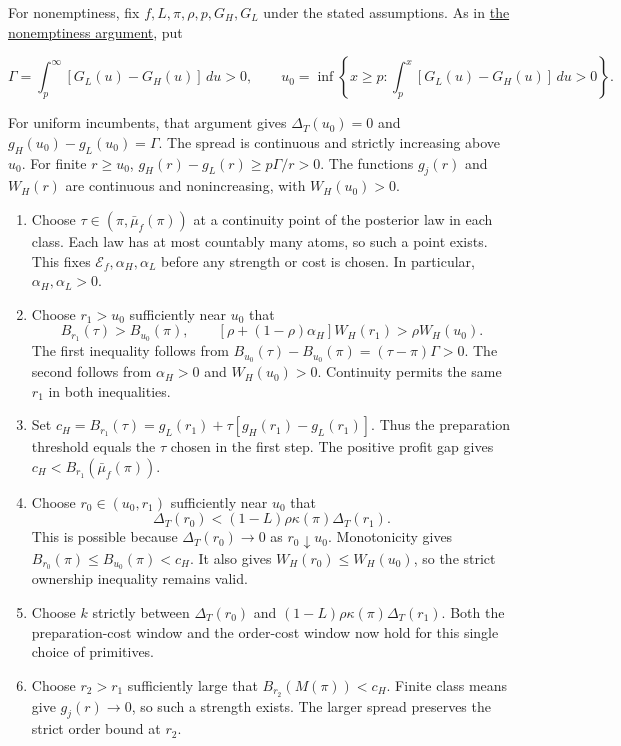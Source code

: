 For nonemptiness, fix \(f,L,\pi,\rho,p,G_H,G_L\) under the stated assumptions.
As in \hyperref[nonemptiness-for-every-value-gap]{the nonemptiness argument}, put

\[
\Gamma=\int_p^\infty[G_L(u)-G_H(u)]\,du>0,\qquad
u_0=\inf\left\{x\ge p:\int_p^x[G_L(u)-G_H(u)]\,du>0\right\}.
\]

For uniform incumbents, that argument gives \(\Delta_T(u_0)=0\) and \(g_H(u_0)-g_L(u_0)=\Gamma\).
The spread is continuous and strictly increasing above \(u_0\).
For finite \(r\ge u_0\), \(g_H(r)-g_L(r)\ge p\Gamma/r>0\).
The functions \(g_j(r)\) and \(W_H(r)\) are continuous and nonincreasing, with \(W_H(u_0)>0\).

\begin{enumerate}
\item
Choose \(\tau\in(\pi,\bar\mu_f(\pi))\) at a continuity point of the posterior law in each class.
Each law has at most countably many atoms, so such a point exists.
This fixes \(\mathcal E_f,\alpha_H,\alpha_L\) before any strength or cost is chosen.
In particular, \(\alpha_H,\alpha_L>0\).

\item
Choose \(r_1>u_0\) sufficiently near \(u_0\) that
\[
B_{r_1}(\tau)>B_{u_0}(\pi),\qquad
[\rho+(1-\rho)\alpha_H]W_H(r_1)>\rho W_H(u_0).
\]
The first inequality follows from
\(B_{u_0}(\tau)-B_{u_0}(\pi)=(\tau-\pi)\Gamma>0\).
The second follows from \(\alpha_H>0\) and \(W_H(u_0)>0\).
Continuity permits the same \(r_1\) in both inequalities.

\item
Set \(c_H=B_{r_1}(\tau)=g_L(r_1)+\tau[g_H(r_1)-g_L(r_1)]\).
Thus the preparation threshold equals the \(\tau\) chosen in the first step.
The positive profit gap gives \(c_H<B_{r_1}(\bar\mu_f(\pi))\).

\item
Choose \(r_0\in(u_0,r_1)\) sufficiently near \(u_0\) that
\[
\Delta_T(r_0)<(1-L)\rho\kappa(\pi)\Delta_T(r_1).
\]
This is possible because \(\Delta_T(r_0)\to0\) as \(r_0\downarrow u_0\).
Monotonicity gives \(B_{r_0}(\pi)\le B_{u_0}(\pi)<c_H\).
It also gives \(W_H(r_0)\le W_H(u_0)\), so the strict ownership inequality remains valid.

\item
Choose \(k\) strictly between \(\Delta_T(r_0)\) and
\((1-L)\rho\kappa(\pi)\Delta_T(r_1)\).
Both the preparation-cost window and the order-cost window now hold for this single choice of primitives.

\item
Choose \(r_2>r_1\) sufficiently large that \(B_{r_2}(M(\pi))<c_H\).
Finite class means give \(g_j(r)\to0\), so such a strength exists.
The larger spread preserves the strict order bound at \(r_2\).
\end{enumerate}

